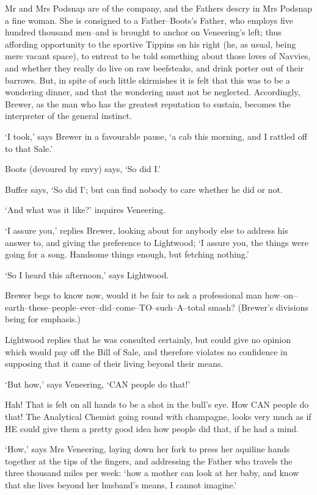 Mr and Mrs Podsnap are of the company, and the Fathers descry in Mrs
Podsnap a fine woman. She is consigned to a Father--Boots’s Father,
who employs five hundred thousand men--and is brought to anchor on
Veneering’s left; thus affording opportunity to the sportive Tippins on
his right (he, as usual, being mere vacant space), to entreat to be told
something about those loves of Navvies, and whether they really do live
on raw beefsteaks, and drink porter out of their barrows. But, in spite
of such little skirmishes it is felt that this was to be a wondering
dinner, and that the wondering must not be neglected. Accordingly,
Brewer, as the man who has the greatest reputation to sustain, becomes
the interpreter of the general instinct.

‘I took,’ says Brewer in a favourable pause, ‘a cab this morning, and I
rattled off to that Sale.’

Boots (devoured by envy) says, ‘So did I.’

Buffer says, ‘So did I’; but can find nobody to care whether he did or
not.

‘And what was it like?’ inquires Veneering.

‘I assure you,’ replies Brewer, looking about for anybody else to
address his answer to, and giving the preference to Lightwood; ‘I assure
you, the things were going for a song. Handsome things enough, but
fetching nothing.’

‘So I heard this afternoon,’ says Lightwood.

Brewer begs to know now, would it be fair to ask a professional man
how--on--earth--these--people--ever--did--come--TO--such--A--total
smash? (Brewer’s divisions being for emphasis.)

Lightwood replies that he was consulted certainly, but could give no
opinion which would pay off the Bill of Sale, and therefore violates no
confidence in supposing that it came of their living beyond their means.

‘But how,’ says Veneering, ‘CAN people do that!’

Hah! That is felt on all hands to be a shot in the bull’s eye. How CAN
people do that! The Analytical Chemist going round with champagne, looks
very much as if HE could give them a pretty good idea how people did
that, if he had a mind.

‘How,’ says Mrs Veneering, laying down her fork to press her aquiline
hands together at the tips of the fingers, and addressing the Father who
travels the three thousand miles per week: ‘how a mother can look at
her baby, and know that she lives beyond her husband’s means, I cannot
imagine.’

